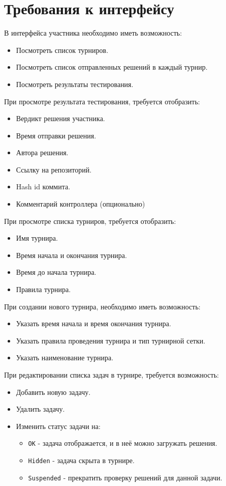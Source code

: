 \documentclass[a4paper,12pt]{article}
\begin{document}
\section{Требования к интерфейсу}
В интерфейса участника необходимо иметь возможность:
\begin{itemize}
    \item Посмотреть список турниров.
    \item Посмотреть список отправленных решений в каждый турнир.
    \item Посмотреть результаты тестирования.
\end{itemize}

При просмотре результата тестирования, требуется отобразить:
\begin{itemize}
    \item Вердикт решения участника.
    \item Время отправки решения.
    \item Автора решения.
    \item Ссылку на репозиторий.
    \item Hash id коммита.
    \item Комментарий контроллера (опционально)
\end{itemize}

При просмотре списка турниров, требуется отобразить:
\begin{itemize}
    \item Имя турнира.
    \item Время начала и окончания турнира.
    \item Время до начала турнира.
    \item Правила турнира.
\end{itemize}

При создании нового турнира, необходимо иметь возможность:
\begin{itemize}
    \item Указать время начала и время окончания турнира.
    \item Указать правила проведения турнира и тип турнирной сетки.
    \item Указать наименование турнира.
\end{itemize}

При редактировании списка задач в турнире, требуется возможность:
\begin{itemize}
    \item Добавить новую задачу.
    \item Удалить задачу. 
    \item Изменить статус задачи на:
    \begin{itemize}
        \item \verb+OK+ - задача отображается, и в неё можно загружать решения.
        \item \verb+Hidden+ - задача скрыта в турнире.
        \item \verb+Suspended+ - прекратить проверку решений для данной задачи.
    \end{itemize}
\end{itemize}
\end{document}
